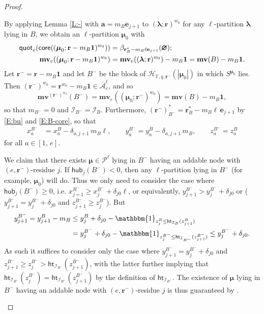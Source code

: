 \documentclass[11pt,a4paper,reqno]{amsart}
\numberwithin{equation}{section}
\theoremstyle{plain}
\theoremstyle{definition}
\theoremstyle{remark}
\numberwithin{equation}{section}
\newcommand{\bone}{\boldsymbol{1}}
\newcommand{\bbone}{\mathbbm{1}}
\newcommand{\bl}{\boldsymbol{\lambda}}
\newcommand{\bm}{\boldsymbol{\mu}}
\newcommand{\ba}{\mathbf{a}}
\newcommand{\br}{\mathbf{r}}
\newcommand{\core}{\mathsf{core}}
\newcommand{\quot}{\mathsf{quot}}
\newcommand{\mv}{\mathbf{mv}}
\newcommand{\HH}{\mathcal{H}}
\newcommand{\FF}{\mathbb{F}}
\newcommand{\hub}{\mathsf{hub}}
\newcommand{\PP}{\mathcal{P}}
\newcommand{\Be}{\mathbf{e}}
\newcommand{\AAbar}{\overline{\mathcal{A}}_e^{\ell}}
\newcommand{\EP}{\pmb{\varnothing}}
\newcommand{\Ht}{\mathsf{ht}}
\newcommand{\II}{\mathcal{I}}
\begin{document}
\begin{proof}
\begin{description}
By applying Lemma \ref{L:-} with $\ba = m_B \Be_{j+1}$ to $(\bl;\br)^{w_0}$ for any $\ell$-partition $\bl$ lying in $B$, we obtain an $\ell$-partition $\bm_0$ with \begin{align}
\quot_e(\core((\bm_0;\br - m_B\bone)^{w_0})) &= \beta_{\br^*_B - m_B\ell \Be_{j+1}}(\EP); \label{E:B-core} \\
\mv_e((\bm_0;\br - m_B\bone)^{w_0}) &= \mv_e((\bl;\br)^{w_0}) - m_B \bone = \mv(B) - m_B\bone. \notag
\end{align}
Let $\br^- = \br - m_B \bone$ and let $B^-$ be the block of $\HH_{\FF,q,\br^-}(|\bm_0|)$ in which $S^{\bm_0}$ lies.
Then $(\br^-)^{w_0} = \br^{w_0} - m_B\bone \in \AAbar$, and so
$$\mv^{(\br^-)^{w_0}}(B^-) = \mv_e((\bm_0;\br^-)^{w_0}) = \mv(B) - m_B\bone,$$
so that $m_{B^-} = 0$ and $\II_{B^-} = \II_B$.
Furthermore, 
$
(\br^{-})^*_{B^-} = 
\br^{*}_B - m_B \ell\, \Be_{j+1} 
$ by \eqref{E:bu} and \eqref{E:B-core}, so that
\begin{align*}
x^{B^-}_a &= x^B_a - \delta_{a,j+1}\,m_B\ell, \qquad
y^{B^-}_a = y^B_a - \delta_{a,j+1}\,m_B, \qquad
z^{B^-}_a = z^B_a
\end{align*}
for all $a \in [1,\,e]$.

We claim that there exists $\bm \in \PP^{\ell}$ lying in $B^-$ having an addable node with $(e,\br^{-})$-residue $j$.
If $\hub_j(B^-) < 0$, then any $\ell$-partition lying in $B^-$ (for example, $\bm_0$) will do.
Thus we only need to consider the case where $\hub_j(B^-) \geq 0$, i.e. $x^{B^-}_{j+1} \geq x^{B^-}_j + \delta_{j0} \ell$, or equivalently,
$y^{B^-}_{j+1} > y^{B^-}_j + \delta_{j0}$ or ($y^{B^-}_{j+1} = y^{B^-}_j + \delta_{j0}$ and $z^{B^-}_{j+1} \geq z^{B^-}_j$).
But
\begin{align*}
y^{B^-}_{j+1} = y^B_{j+1} - m_B &\leq y^B_j + \delta_{j0} - \bbone_{z^B_j \leq \Ht_{\II_B}(z^B_{j+1})} \\
&= y^{B^-}_j + \delta_{j0} - \bbone_{z^{B^-}_j \leq \Ht_{\II_{B^-}}(z^{B^-}_{j+1})}
\leq y^{B^-}_j + \delta_{j0}.
\end{align*}
As such it suffices to consider only the case where $y^{B^-}_{j+1} = y^{B^-}_j + \delta_{j0}$ and $z^{B^-}_{j+1} \geq z^{B^-}_j > \Ht_{\II_{B^-}}(z^{B^-}_{j+1})$, with the latter further implying that $\Ht_{\II_{B^-}}(z^{B^-}_j) = \Ht_{\II_{B^-}}(z^{B^-}_{j+1})$ by the definition of $\Ht_{\II_{B^-}}$.
The existence of $\bm$ lying in $B^-$ having an addable node with $(e,\br^{-})$-residue $j$ is thus guaranteed by \cite[Proposition 4.23]{LQT}.


\end{description}
\end{proof}
\end{document}
